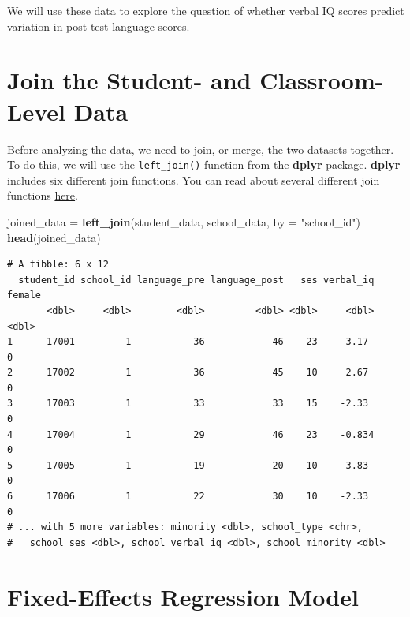 \documentclass[]{book}
\newenvironment{Shaded}{\begin{snugshade}}{\end{snugshade}}
\newcommand{\DataTypeTok}[1]{\textcolor[rgb]{0.13,0.29,0.53}{#1}}
\newcommand{\KeywordTok}[1]{\textcolor[rgb]{0.13,0.29,0.53}{\textbf{#1}}}
\newcommand{\NormalTok}[1]{#1}
\newcommand{\StringTok}[1]{\textcolor[rgb]{0.31,0.60,0.02}{#1}}
\begin{document}
We will use these data to explore the question of whether verbal IQ scores predict variation in post-test language scores.

\hypertarget{join-the-student--and-classroom-level-data}{%
\section{Join the Student- and Classroom-Level Data}\label{join-the-student--and-classroom-level-data}}

Before analyzing the data, we need to join, or merge, the two datasets together. To do this, we will use the \texttt{left\_join()} function from the \textbf{dplyr} package. \textbf{dplyr} includes six different join functions. You can read about several different join functions \href{https://cran.r-project.org/web/packages/dplyr/vignettes/two-table.html}{here}.

\begin{Shaded}
\begin{Highlighting}[]
\NormalTok{joined_data =}\StringTok{ }\KeywordTok{left_join}\NormalTok{(student_data, school_data, }\DataTypeTok{by =} \StringTok{"school_id"}\NormalTok{)}
\KeywordTok{head}\NormalTok{(joined_data)}
\end{Highlighting}
\end{Shaded}

\begin{verbatim}
# A tibble: 6 x 12
  student_id school_id language_pre language_post   ses verbal_iq female
       <dbl>     <dbl>        <dbl>         <dbl> <dbl>     <dbl>  <dbl>
1      17001         1           36            46    23     3.17       0
2      17002         1           36            45    10     2.67       0
3      17003         1           33            33    15    -2.33       0
4      17004         1           29            46    23    -0.834      0
5      17005         1           19            20    10    -3.83       0
6      17006         1           22            30    10    -2.33       0
# ... with 5 more variables: minority <dbl>, school_type <chr>,
#   school_ses <dbl>, school_verbal_iq <dbl>, school_minority <dbl>
\end{verbatim}

\hypertarget{fixed-effects-regression-model}{%
\section{Fixed-Effects Regression Model}\label{fixed-effects-regression-model}}
\end{document}
